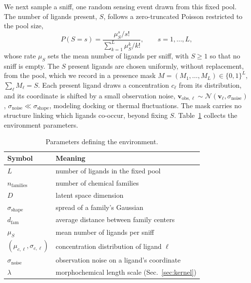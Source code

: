 \documentclass[aps,pre,superscriptaddress,floatfix,longbibliography,linenumbers]{revtex4-2}
\begin{document}
We next sample a sniff, one random sensing event drawn from this fixed pool.
The number of ligands present, $S$, follows a zero-truncated Poisson
restricted to the pool size,
\begin{equation}
P(S=s) = \frac{\mu_S^s/s!}{\sum_{k=1}^{L}\mu_S^k/k!}, \qquad s=1,\dots,L,
\label{eq:ztp}
\end{equation}
whose rate $\mu_S$ sets the mean number of ligands per sniff, with $S\ge1$ so
that no sniff is empty. The $S$ present ligands are chosen uniformly, without
replacement, from the pool, which we record in a presence mask
$M=(M_1,\dots,M_L)\in\{0,1\}^L$, $\sum_\ell M_\ell = S$. Each present ligand
draws a concentration $c_\ell$ from its distribution, and its coordinate is
shifted by a small observation noise,
$\mathbf v_{\text{obs},\ell}\sim\mathcal N(\mathbf v_\ell,\sigma_\text{noise})$,
$\sigma_\text{noise}\ll\sigma_\text{shape}$, modeling docking or thermal
fluctuations. The mask carries no structure linking which ligands co-occur,
beyond fixing $S$. Table~\ref{tab:env_params} collects the environment
parameters.

\begin{table}[t]
\centering
\begin{tabular}{ll}
Symbol & Meaning \\
\hline
$L$ & number of ligands in the fixed pool \\
$n_\text{families}$ & number of chemical families \\
$D$ & latent space dimension \\
$\sigma_\text{shape}$ & spread of a family's Gaussian \\
$d_\text{fam}$ & average distance between family centers \\
$\mu_S$ & mean number of ligands per sniff \\
$(\mu_{c,\ell},\sigma_{c,\ell})$ & concentration distribution of ligand $\ell$ \\
$\sigma_\text{noise}$ & observation noise on a ligand's coordinate \\
$\lambda$ & morphochemical length scale (Sec.~\ref{sec:kernel}) \\
\end{tabular}
\caption{Parameters defining the environment.}
\label{tab:env_params}
\end{table}
\end{document}
